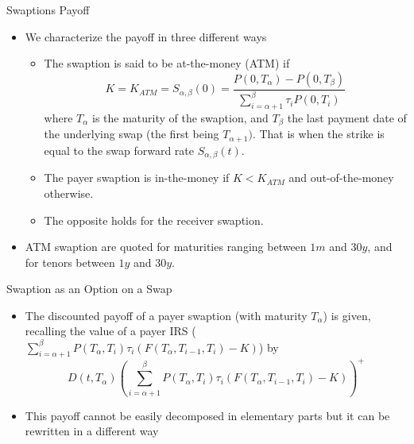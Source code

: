 \documentclass{beamer}
\begin{document}
\begin{frame}{Swaptions Payoff}
	\begin{itemize}	
		\item We characterize the payoff in three different ways
		\begin{itemize}
			\item The swaption is said to be at-the-money (ATM) if
			\begin{equation*}
				K = K_{ATM} = S_{\alpha,\beta}(0) = \frac{P(0,T_\alpha)-P(0,T_\beta)}{\sum_{i=\alpha+1}^\beta \tau_i P(0,T_i)}
			\end{equation*}
			where $T_\alpha$ is the maturity of the swaption, and $T_\beta$ the last payment date of the underlying swap (the first being $T_{\alpha+1})$. That is when the strike is equal to the swap forward rate $S_{\alpha,\beta}(t)$.
			\item The payer swaption is in-the-money if $K<K_{ATM}$ and out-of-the-money otherwise.
			\item The opposite holds for the receiver swaption.
		\end{itemize}
		\item ATM swaption are quoted for maturities ranging between $1m$ and $30y$, and for tenors between $1y$ and $30y$.
	\end{itemize}
\end{frame}

\begin{frame}{Swaption as an Option on a Swap}
	\begin{itemize}
		\item The discounted payoff of a payer swaption (with maturity $T_\alpha$) is given, recalling the value of a payer IRS ($
			\sum_{i=\alpha+1}^\beta P(T_\alpha,T_i)\tau_i (F(T_\alpha,T_{i-1},T_i) - K)$)
		by
		\begin{equation}
			D(t,T_\alpha)\left(\sum_{i=\alpha+1}^\beta P(T_\alpha,T_i)\tau_i (F(T_\alpha,T_{i-1},T_i) - K)\right)^+
		\end{equation}
		\item This payoff cannot be easily decomposed in elementary parts but it can be rewritten in a different way
	\end{itemize}
\end{frame}
\end{document}
